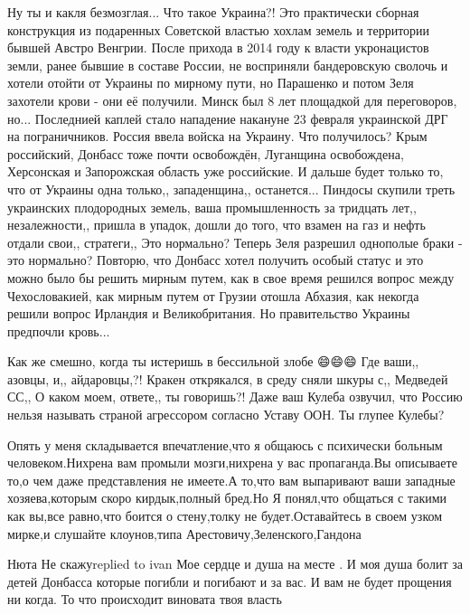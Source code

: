 Ну ты и какля безмозглая...
Что такое Украина?! Это практически сборная конструкция из подаренных Советской властью хохлам земель и территории бывшей Австро Венгрии.
После прихода в 2014 году к власти укронацистов земли, ранее бывшие в составе России, не восприняли бандеровскую сволочь и хотели отойти от Украины по мирному пути, но Парашенко и потом Зеля захотели крови - они её получили. Минск был 8 лет площадкой для переговоров, но... Последнией каплей стало нападение накануне 23 февраля украинской ДРГ на пограничников. Россия ввела войска на Украину.
Что получилось?
Крым российский, Донбасс тоже почти освобождён, Луганщина освобождена, Херсонская и Запорожская область уже российские.
И дальше будет только то, что от Украины одна только,, западенщина,, останется...
Пиндосы скупили треть украинских плодородных земель, ваша промышленность за тридцать лет,, незалежности,, пришла в упадок, дошли до того, что взамен на газ и нефть отдали свои,, стратеги,,
Это нормально?
Теперь Зеля разрешил однополые браки - это нормально?
Повторю, что Донбасс хотел получить особый статус и это можно было бы решить мирным путем, как в свое время решился вопрос между Чехословакией, как мирным путем от Грузии отошла Абхазия, как некогда решили вопрос Ирландия и Великобритания.
Но правительство Украины предпочли кровь...

Как же смешно, когда ты истеришь в бессильной злобе 😄😄😄
Где ваши,, азовцы, и,, айдаровцы,?!
Кракен открякался, в среду сняли шкуры с,, Медведей СС,,
О каком моем, ответе,, ты говоришь?!
Даже ваш Кулеба озвучил, что Россию нельзя называть страной агрессором согласно Уставу ООН.
Ты глупее Кулебы?


Опять у меня складывается впечатление,что я общаюсь с психически больным
человеком.Нихрена вам промыли мозги,нихрена у вас пропаганда.Вы описываете то,о
чем даже представления не имеете.А то,что вам выпаривают ваши западные
хозяева,которым скоро кирдык,полный бред.Но Я понял,что общаться с такими как
вы,все равно,что боится о стену,толку не будет.Оставайтесь в своем узком
мирке,и слушайте клоунов,типа Арестовичу,Зеленского,Гандона


Нюта Не скажуreplied to ivan
Мое сердце и душа на месте . И моя душа болит за детей Донбасса которые погибли и погибают и за вас. И вам не будет прощения ни когда. То что происходит виновата твоя власть

